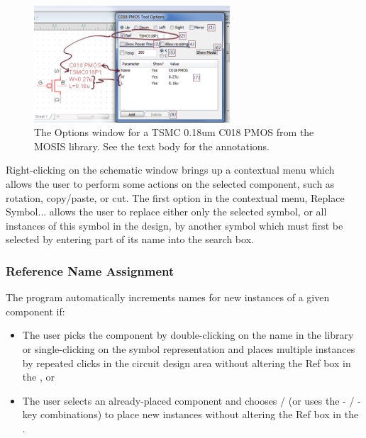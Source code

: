 \begin{figure}
    \includegraphics[width=0.65\textwidth]{./figures/schematic_editor_figures/SchematicEditor_PartOptionsDialogue_Annotated.png}
    \caption{{The Options window for a \textsf{TSMC 0.18um C018 PMOS} from the \textsf{MOSIS} library.  See the text body for the annotations.}}
  \label{fig_schematiceditor_annotatedoptions}
\end{figure}


Right-clicking on the schematic window brings up a contextual menu which allows the user to perform some actions on the selected component, such as rotation, copy/paste, or cut.  The first option in the contextual menu, \textsf{Replace Symbol...} allows the user to replace either only the selected symbol, or all instances of this symbol in the design, by another symbol which must first be selected by entering part of its name into the search box.


\subsubsection{Reference Name Assignment}

The program automatically increments names for new instances of a given {component} if:
\begin{itemize}
\item The user picks the component by double-clicking on the name in the library or single-clicking on the symbol representation and places multiple instances by repeated clicks in the circuit design area without altering the \textsf{Ref} box in the , or
\item The user selects an already-placed component and chooses  /  (or uses the - / - key combinations) to place new instances without altering the \textsf{Ref} box in the .
\end{itemize}


